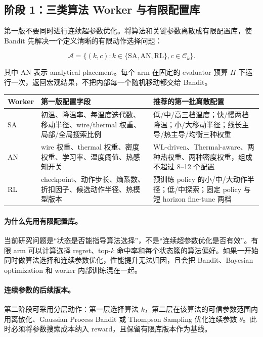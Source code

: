 \documentclass[UTF8,a4paper,11pt]{ctexart}
\begin{document}
\subsection{阶段 1：三类算法 Worker 与有限配置库}

第一版不要同时进行连续超参数优化。将算法和关键参数离散成有限配置库，使 Bandit 先解决一个定义清晰的有限动作选择问题：

\begin{equation}
\mathcal{A}=\{(k,c): k\in\{\mathrm{SA},\mathrm{AN},\mathrm{RL}\},c\in\mathcal{C}_k\}.
\end{equation}

其中 AN 表示 analytical placement。每个 arm 在固定的 evaluator 预算 \(H\) 下运行一次，返回宏观结果，不把内部每一个随机移动都交给 Bandit。

\begin{table}[htbp]
\centering
\small
\begin{tabularx}{\textwidth}{p{}p{}X}
\toprule
Worker & 第一版配置字段 & 推荐的第一批离散配置 \\
\midrule
SA & 初温、降温率、每温度迭代数、移动半径、wire/thermal 权重、局部/全局搜索比例 & 低/中/高三档温度；快/慢两档降温；小/大移动半径；线长主导/热主导/均衡三种权重 \\
AN & wire 权重、thermal 权重、密度权重、学习率、温度阈值、热感知开关 & WL-driven、Thermal-aware、两种热权重、两种密度权重，组成不超过 8--12 个配置 \\
RL & checkpoint、动作步长、熵系数、折扣因子、候选动作半径、热模型版本 & 预训练 policy 的小/中/大动作半径；低/中探索；固定 policy 与短 horizon fine-tune 两档 \\
\bottomrule
\end{tabularx}
\end{table}

\paragraph{为什么先用有限配置库。} 当前研究问题是“状态是否能指导算法选择”，不是“连续超参数优化是否有效”。有限 arm 可以计算选择 regret、top-$k$ 命中率和每个状态簇的算法偏好。如果一开始同时做算法选择和连续参数优化，性能提升无法归因，且会把 Bandit、Bayesian optimization 和 worker 内部训练混在一起。

\paragraph{连续参数的后续版本。} 第二阶段可采用分层动作：第一层选择算法 \(k\)，第二层在该算法的可信参数范围内用离散化、Gaussian Process Bandit 或 Thompson Sampling 优化连续参数 \(\theta\)。此时必须将参数搜索成本纳入 reward，且保留有限库版本作为基线。
\end{document}
